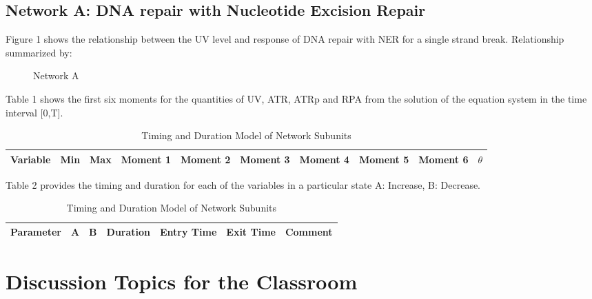\documentclass[preprint, 8pt]{elsarticle}
\theoremstyle{definition}
\begin{document}
\begin{table}[H]

\subsection{Network A: DNA repair with Nucleotide Excision Repair}
\raggedright
Figure 1 shows the relationship between the UV level and response of DNA repair with NER for a single strand break.  Relationship summarized by:

\begin{enumerate}
\end{enumerate}

\vspace{6pt}
\begin{figure}[H]
	\centering
	\caption{Network A}
	\label{fig:Figure1}
\end{figure}

Table 1 shows the first six moments for the quantities of UV, ATR, ATRp and RPA from the solution of the equation system in the time interval [0,T].
\centering
\begin{table}[H]\tiny
 \caption{Moment Analysis for Network A}
\begin{tabular}{rp{.3cm}p{.3cm}p{.25cm}p{.25cm}p{.25cm}p{.25cm}p{.25cm}p{.25cm}p{.25cm}}
	\hline
	Variable &Min & Max & Moment 1 & Moment 2 & Moment 3 & Moment 4 & Moment 5 & Moment 6 &  $\theta$\\ 
	\hline
	\hline
	\end{tabular}
\end{table}
\raggedright

Table 2 provides the timing and duration for each of the variables in a particular state A: Increase, B: Decrease.  

\begin{enumerate}
\end{enumerate}

\begin{table}[H]\tiny
  \caption{Timing and Duration Model of Network Subunits}
\begin{tabular}{rllp{1.25cm}lll}
		\hline	
		Parameter & A & B & Duration & Entry Time &  Exit Time & Comment \\
		 \hline 
		\hline
\end{tabular}
\end{table}


\section{Discussion Topics for the Classroom}


\end{table}
\end{document}
